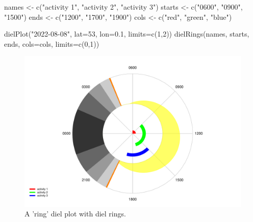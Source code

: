 \documentclass[
]{book}
\newenvironment{Shaded}{\begin{snugshade}}{\end{snugshade}}
\newcommand{\AttributeTok}[1]{\textcolor[rgb]{0.77,0.63,0.00}{#1}}
\newcommand{\DecValTok}[1]{\textcolor[rgb]{0.00,0.00,0.81}{#1}}
\newcommand{\FloatTok}[1]{\textcolor[rgb]{0.00,0.00,0.81}{#1}}
\newcommand{\FunctionTok}[1]{\textcolor[rgb]{0.00,0.00,0.00}{#1}}
\newcommand{\NormalTok}[1]{#1}
\newcommand{\OtherTok}[1]{\textcolor[rgb]{0.56,0.35,0.01}{#1}}
\newcommand{\StringTok}[1]{\textcolor[rgb]{0.31,0.60,0.02}{#1}}
\begin{document}
\begin{Shaded}
\begin{Highlighting}[]
\NormalTok{names }\OtherTok{\textless{}{-}} \FunctionTok{c}\NormalTok{(}\StringTok{"activity 1"}\NormalTok{, }\StringTok{"activity 2"}\NormalTok{, }\StringTok{"activity 3"}\NormalTok{)}
\NormalTok{starts }\OtherTok{\textless{}{-}} \FunctionTok{c}\NormalTok{(}\StringTok{"0600"}\NormalTok{, }\StringTok{"0900"}\NormalTok{, }\StringTok{"1500"}\NormalTok{)}
\NormalTok{ends }\OtherTok{\textless{}{-}} \FunctionTok{c}\NormalTok{(}\StringTok{"1200"}\NormalTok{, }\StringTok{"1700"}\NormalTok{, }\StringTok{"1900"}\NormalTok{)}
\NormalTok{cols }\OtherTok{\textless{}{-}} \FunctionTok{c}\NormalTok{(}\StringTok{"red"}\NormalTok{, }\StringTok{"green"}\NormalTok{, }\StringTok{"blue"}\NormalTok{)}

\FunctionTok{dielPlot}\NormalTok{(}\StringTok{"2022{-}08{-}08"}\NormalTok{, }\AttributeTok{lat=}\DecValTok{53}\NormalTok{, }\AttributeTok{lon=}\FloatTok{0.1}\NormalTok{, }\AttributeTok{limits=}\FunctionTok{c}\NormalTok{(}\DecValTok{1}\NormalTok{,}\DecValTok{2}\NormalTok{))}
\FunctionTok{dielRings}\NormalTok{(names, starts, ends, }\AttributeTok{cols=}\NormalTok{cols, }\AttributeTok{limits=}\FunctionTok{c}\NormalTok{(}\DecValTok{0}\NormalTok{,}\DecValTok{1}\NormalTok{))}
\end{Highlighting}
\end{Shaded}

\begin{figure}

{\centering \includegraphics[width=0.9\linewidth]{_main_files/figure-latex/diel-plot-rings-2-1} 

}

\caption{A 'ring' diel plot with diel rings.}\label{fig:diel-plot-rings-2}
\end{figure}
\end{document}
